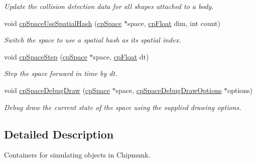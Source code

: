 \begin{DoxyCompactItemize}
\begin{DoxyCompactList}\small\item\em Update the collision detection data for all shapes attached to a body. \end{DoxyCompactList}\item 
\hypertarget{group__cp_space_gae80141ab89b21e48a10850c3e2c81e91}{}void \hyperlink{group__cp_space_gae80141ab89b21e48a10850c3e2c81e91}{cp\+Space\+Use\+Spatial\+Hash} (\hyperlink{structcp_space}{cp\+Space} $\ast$space, \hyperlink{group__basic_types_gac1ed65573e035bf892505768c852d8d3}{cp\+Float} dim, int count)\label{group__cp_space_gae80141ab89b21e48a10850c3e2c81e91}

\begin{DoxyCompactList}\small\item\em Switch the space to use a spatial hash as it\textquotesingle{}s spatial index. \end{DoxyCompactList}\item 
\hypertarget{group__cp_space_gad8a6c8e7e99ae268af224aa199124706}{}void \hyperlink{group__cp_space_gad8a6c8e7e99ae268af224aa199124706}{cp\+Space\+Step} (\hyperlink{structcp_space}{cp\+Space} $\ast$space, \hyperlink{group__basic_types_gac1ed65573e035bf892505768c852d8d3}{cp\+Float} dt)\label{group__cp_space_gad8a6c8e7e99ae268af224aa199124706}

\begin{DoxyCompactList}\small\item\em Step the space forward in time by {\ttfamily dt}. \end{DoxyCompactList}\item 
\hypertarget{group__cp_space_gaa1233930591cb32d25852da2cbe76680}{}void \hyperlink{group__cp_space_gaa1233930591cb32d25852da2cbe76680}{cp\+Space\+Debug\+Draw} (\hyperlink{structcp_space}{cp\+Space} $\ast$space, \hyperlink{structcp_space_debug_draw_options}{cp\+Space\+Debug\+Draw\+Options} $\ast$options)\label{group__cp_space_gaa1233930591cb32d25852da2cbe76680}

\begin{DoxyCompactList}\small\item\em Debug draw the current state of the space using the supplied drawing options. \end{DoxyCompactList}\end{DoxyCompactItemize}


\subsection{Detailed Description}
Containers for simulating objects in Chipmunk. 

